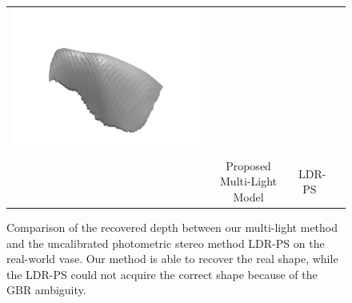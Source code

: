 \begin{figure}[H]
{\begin{tabular}{c c c c}
   \includegraphics[height = 0.28\linewidth]{figures/result/ps_LDR.pdf} &
      \multirow{-6}{*}{\parbox[t]{2.5mm}{}}\\ 
  {} & {Proposed Multi-Light Model} & {LDR-PS~\cite{favaro2012closed}} & {}             \\
 \end{tabular}}
\caption{Comparison of the recovered depth between our multi-light method and the uncalibrated photometric stereo method LDR-PS on the real-world vase. Our method is able to recover the real shape, while the LDR-PS could not acquire the correct shape because of the GBR ambiguity.}
\label{fig:ps_comp}
\end{figure}



